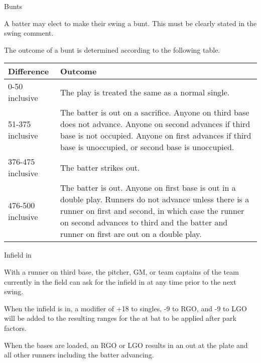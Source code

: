 \begin{deepEnumerate}
\begin{deepEnumerate}
\begin{center}
		\end{center}
	\end{deepEnumerate}
	\item Bunts
	\begin{deepEnumerate}
		\item A batter may elect to make their swing a bunt. This must be clearly stated in the swing comment.
		\item The outcome of a bunt is determined according to the following table.        
		\begin{center}
			\begin{tabular}{|p{3cm}|p{8cm}|}
				\hline
				\textbf{Difference} & \textbf{Outcome}                                 \\
				\hline 
				0-50 inclusive                 & The play is treated the same as a normal single. \\
				\hline 
				51-375 inclusive               & The batter is out on a sacrifice.                
				Anyone on third base does not advance.
				Anyone on second advances if third base is not occupied.
				Anyone on first advances if third base is unoccupied, or second base is unoccupied. \\
				\hline 
				376-475 inclusive              & The batter strikes out.                          \\
				\hline
				476-500 inclusive              & The batter is out.                               
				Anyone on first base is out in a double play.
				Runners do not advance unless there is a runner on first and second, in which
				case the runner on second advances to third and the batter and runner on first are out on a double play. \\
				\hline
			\end{tabular}
		\end{center}
    \end{deepEnumerate}
    \item Infield in
    \begin{deepEnumerate}
        \item With a runner on third base, the pitcher, GM, or team captains of the team currently in the field 
        can ask for the infield in at any time prior to the next swing.
        \item When the infield is in, a modifier of +18 to singles, -9 to RGO, and -9 to LGO 
        will be added to the resulting ranges for the at bat to be applied after park factors.
        \item When the bases are loaded, an RGO or LGO results in an out at the plate and all other runners including the batter advancing.

\end{deepEnumerate}
\end{deepEnumerate}
